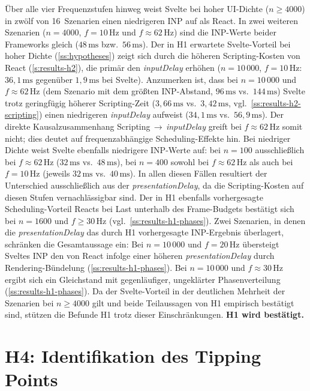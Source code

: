 Über alle vier Frequenzstufen hinweg weist Svelte bei hoher UI-Dichte ($n \geq 4000$) in zwölf von 16~Szenarien einen niedrigeren INP auf als React. In zwei weiteren Szenarien ($n = 4000$, $f = 10\,\text{Hz}$ und $f \approx 62\,\text{Hz}$) sind die INP-Werte beider Frameworks gleich ($48\,\text{ms}$ bzw.\ $56\,\text{ms}$). Der in H1 erwartete Svelte-Vorteil bei hoher Dichte (\cref{ss:hypotheses}) zeigt sich durch die höheren Scripting-Kosten von React (\cref{s:results-h2}), die primär den \textit{inputDelay} erhöhen ($n = 10\,000$, $f = 10\,\text{Hz}$: $36{,}1\,\text{ms}$ gegenüber $1{,}9\,\text{ms}$ bei Svelte). Anzumerken ist, dass bei $n = 10\,000$ und $f \approx 62\,\text{Hz}$ (dem Szenario mit dem größten INP-Abstand, $96\,\text{ms}$ vs.\ $144\,\text{ms}$) Svelte trotz geringfügig höherer Scripting-Zeit ($3{,}66\,\text{ms}$ vs.\ $3{,}42\,\text{ms}$, vgl.~\cref{ss:results-h2-scripting}) einen niedrigeren \textit{inputDelay} aufweist ($34{,}1\,\text{ms}$ vs.\ $56{,}9\,\text{ms}$). Der direkte Kausalzusammenhang Scripting\,$\rightarrow$\,\textit{inputDelay} greift bei $f \approx 62\,\text{Hz}$ somit nicht; dies deutet auf frequenzabhängige Scheduling-Effekte hin. Bei niedriger Dichte weist Svelte ebenfalls niedrigere INP-Werte auf: bei $n = 100$ ausschließlich bei $f \approx 62\,\text{Hz}$ ($32\,\text{ms}$ vs.\ $48\,\text{ms}$), bei $n = 400$ sowohl bei $f \approx 62\,\text{Hz}$ als auch bei $f = 10\,\text{Hz}$ (jeweils $32\,\text{ms}$ vs.\ $40\,\text{ms}$). In allen diesen Fällen resultiert der Unterschied ausschließlich aus der \textit{presentationDelay}, da die Scripting-Kosten auf diesen Stufen vernachlässigbar sind. Der in H1 ebenfalls vorhergesagte Scheduling-Vorteil Reacts bei Last unterhalb des Frame-Budgets bestätigt sich bei $n = 1600$ und $f \geq 30\,\text{Hz}$ (vgl.~\cref{ss:results-h1-phases}). Zwei Szenarien, in denen die \textit{presentationDelay} das durch H1 vorhergesagte INP-Ergebnis überlagert, schränken die Gesamtaussage ein: Bei $n = 10\,000$ und $f = 20\,\text{Hz}$ übersteigt Sveltes INP den von React infolge einer höheren \textit{presentationDelay} durch Rendering-Bündelung (\cref{ss:results-h1-phases}). Bei $n = 10\,000$ und $f \approx 30\,\text{Hz}$ ergibt sich ein Gleichstand mit gegenläufiger, ungeklärter Phasenverteilung (\cref{ss:results-h1-phases}). Da der Svelte-Vorteil in der deutlichen Mehrheit der Szenarien bei $n \geq 4000$ gilt und beide Teilaussagen von H1 empirisch bestätigt sind, stützen die Befunde H1 trotz dieser Einschränkungen. \textbf{H1 wird bestätigt.}

\section{H4: Identifikation des Tipping Points}
\label{s:results-h4}

